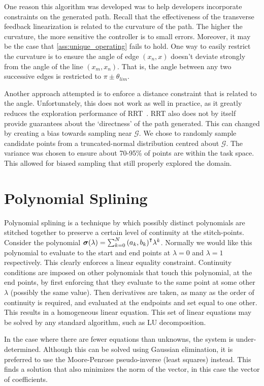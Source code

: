 One reason this algorithm was developed was to help developers incorporate constraints on the generated path. Recall that the effectiveness of the transverse feedback linearization is related to the curvature of the path. The higher the curvature, the more sensitive the controller is to small errors. Moreover, it may be the case that \eqref{ass:unique_operating} fails to hold. One way to easily restrict the curvature is to ensure the angle of edge $(x_n, x)$ doesn't deviate strongly from the angle of the line $(x_m, x_n)$. That is, the angle between any two successive edges is restricted to $\pi\pm\theta_{lim}$.

Another approach attempted is to enforce a distance constraint that is related to the angle. Unfortunately, this does not work as well in practice, as it greatly reduces the exploration performance of RRT~\cite{Yang14}. RRT also does not by itself provide guarantees about the `directness' of the path generated. This can changed by creating a bias towards sampling near $\mathcal{G}$\cite{LaValle06}\cite{Yang14}. We chose to randomly sample candidate points from a truncated-normal distribution centred about $\mathcal{G}$. The variance was chosen to ensure about 70-95\% of points are within the task space. This allowed for biased sampling that still properly explored the domain.

\section{Polynomial Splining}
Polynomial splining is a technique by which possibly distinct polynomials are stitched together to preserve a certain level of continuity at the stitch-points. Consider the polynomial $\bm{\sigma}(\lambda) = \sum_{k=0}^N{{(a_{k},b_{k})}^{\intercal}\lambda^k}$. Normally we would like this polynomial to evaluate to the start and end points at $\lambda=0$ and $\lambda=1$ respectively. This clearly enforces a linear equality constraint. Continuity conditions are imposed on other polynomials that touch this polynomial, at the end points, by first enforcing that they evaluate to the same point at some other $\lambda$ (possibly the same value). Then derivatives are taken, as many as the order of continuity is required, and evaluated at the endpoints and set equal to one other. This results in a homogeneous linear equation. This set of linear equations may be solved by any standard algorithm, such as LU decomposition.

In the case where there are fewer equations than unknowns, the system is under-determined. Although this can be solved using Gaussian elimination, it is preferred to use the Moore-Penrose pseudo-inverse (least squares) instead. This finds a solution that also minimizes the norm of the vector, in this case the vector of coefficients.

